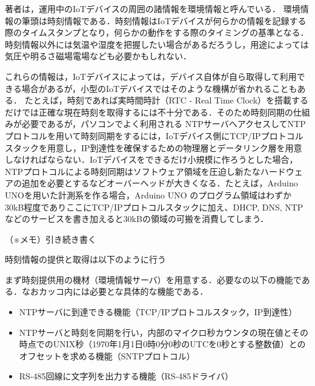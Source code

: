 著者は，運用中のIoTデバイスの周囲の諸情報を環境情報と呼んでいる．
環境情報の筆頭は時刻情報である．時刻情報はIoTデバイスが何らかの情報を記録する際のタイムスタンプとなり，何らかの動作をする際のタイミングの基準となる．
時刻情報以外には気温や湿度を把握したい場合があるだろうし，用途によっては気圧や明るさ磁場電場なども必要かもしれない．

これらの情報は，IoTデバイスによっては，デバイス自体が自ら取得して利用できる場合があるが，小型のIoTデバイスではそのような機構が省かれることもある．
たとえば，時刻であれば実時間時計（RTC - Real Time Clock）を搭載するだけでは正確な現在時刻を取得するには不十分である．そのため時刻同期の仕組みが必要であるが，パソコンでよく利用される NTPサーバへアクセスしてNTPプロトコルを用いて時刻同期をするには，IoTデバイス側にTCP/IPプロトコルスタックを用意し，IP到達性を確保するための物理層とデータリンク層を用意しなければならない．IoTデバイスをできるだけ小規模に作ろうとした場合，NTPプロトコルによる時刻同期はソフトウェア領域を圧迫し新たなハードウェアの追加を必要とするなどオーバーヘッドが大きくなる．たとえば，Arduino UNOを用いた計測系を作る場合，Arduino UNO のプログラム領域はわずか 30kB程度でありここにTCP/IPプロトコルスタックに加え、DHCP, DNS, NTP などのサービスを書き加えると30kBの領域の可搬を消費してしまう．

（※メモ）引き続き書く


\vspace{0.5zh}
 \par
\vspace{0.5zh}

時刻情報の提供と取得は以下のように行う

まず時刻提供用の機材（環境情報サーバ）を用意する．必要なの以下の機能である．なおカッコ内には必要とな具体的な機能である．

\begin{itemize}
\item NTPサーバに到達できる機能（TCP/IPプロトコルスタック，IP到達性）
\item NTPサーバと時刻を同期を行い，内部のマイクロ秒カウンタの現在値とその時点でのUNIX秒（1970年1月1日0時0分0秒のUTCを0秒とする整数値）とのオフセットを求める機能（SNTPプロトコル）
\item RS-485回線に文字列を出力する機能（RS-485ドライバ）
\end{itemize}

